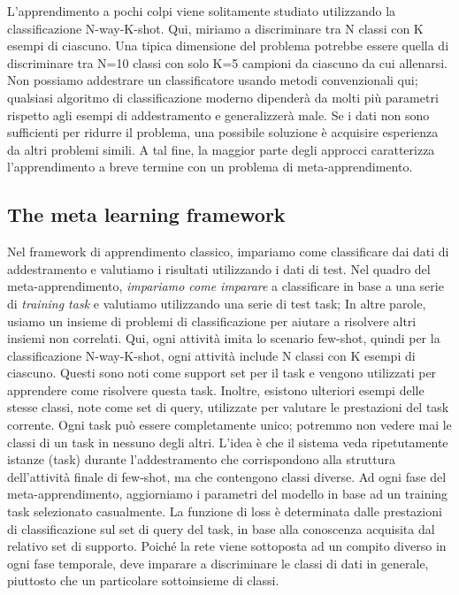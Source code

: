 \documentclass[12pt,a4paper,titlepage]{article}
\begin{document}
L'apprendimento a pochi colpi viene solitamente studiato utilizzando la classificazione N-way-K-shot. Qui, miriamo a discriminare tra N classi con K esempi di ciascuno. Una tipica dimensione del problema potrebbe essere quella di discriminare tra N=10 classi con solo K=5 campioni da ciascuno da cui allenarsi. Non possiamo addestrare un classificatore usando metodi convenzionali qui; qualsiasi algoritmo di classificazione moderno dipenderà da molti più parametri rispetto agli esempi di addestramento e generalizzerà male.
Se i dati non sono sufficienti per ridurre il problema, una possibile soluzione è acquisire esperienza da altri problemi simili. A tal fine, la maggior parte degli approcci caratterizza l'apprendimento a breve termine con un problema di meta-apprendimento.

\subsection{The meta learning framework}
Nel framework di apprendimento classico, impariamo come classificare dai dati di addestramento e valutiamo i risultati utilizzando i dati di test. Nel quadro del meta-apprendimento, \textit{impariamo come imparare} a classificare in base a una serie di \textit{training task} e valutiamo utilizzando una serie di test task; In altre parole, usiamo un insieme di problemi di classificazione per aiutare a risolvere altri insiemi non correlati.
Qui, ogni attività imita lo scenario few-shot, quindi per la classificazione N-way-K-shot, ogni attività include N classi con K esempi di ciascuno. Questi sono noti come support set per il task e vengono utilizzati per apprendere come risolvere questa task. Inoltre, esistono ulteriori esempi delle stesse classi, note come set di query, utilizzate per valutare le prestazioni del task corrente. Ogni task può essere completamente unico; potremmo non vedere mai le classi di un task in nessuno degli altri. L'idea è che il sistema veda ripetutamente istanze (task) durante l'addestramento che corrispondono alla struttura dell'attività finale di few-shot, ma che contengono classi diverse.
Ad ogni fase del meta-apprendimento, aggiorniamo i parametri del modello in base ad un training task selezionato casualmente. La funzione di loss è determinata dalle prestazioni di classificazione sul set di query del task, in base alla conoscenza acquisita dal relativo set di supporto. Poiché la rete viene sottoposta ad un compito diverso in ogni fase temporale, deve imparare a discriminare le classi di dati in generale, piuttosto che un particolare sottoinsieme di classi.
\end{document}
